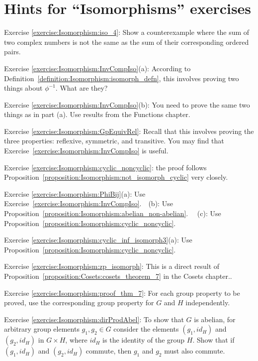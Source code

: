 \section{Hints for ``Isomorphisms'' exercises}
\label{sec:Isomorphism:Hints} 


\noindent Exercise \ref{exercise:Isomorphism:iso_4}:  Show a counterexample where the sum of two complex numbers is not the same as the sum of their corresponding ordered pairs.

\noindent Exercise \ref{exercise:Isomorphism:InvCompIso}(a):  According to Definition~\ref{definition:Isomorphism:isomorph_defn}, this involves proving two things about $\phi^{-1}$.  What are they?

\noindent Exercise \ref{exercise:Isomorphism:InvCompIso}(b): You need to prove the same two things as in part (a).  Use results from the Functions chapter.

\noindent Exercise \ref{exercise:Isomorphism:GpEquivRel}:   Recall that this involves proving the three properties: reflexive, symmetric, and transitive. You may find that Exercise~\ref{exercise:Isomorphism:InvCompIso}  is useful.

\noindent Exercise \ref{exercise:Isomorphism:cyclic_noncyclic}:   the proof follows Proposition~\ref{proposition:Isomorphism:not_isomorph_cyclic} very closely.

\noindent Exercise \ref{exercise:Isomorphism:PhiBij}(a): Use Exercise~\ref{exercise:Isomorphism:InvCompIso}.~~(b):  Use Proposition~\ref{proposition:Isomorphism:abelian_non-abelian}. ~~(c):  Use Proposition~\ref{proposition:Isomorphism:cyclic_noncyclic}. 

\noindent Exercise \ref{exercise:Isomorphism:cyclic_inf_isomorph3}(a): Use Proposition~\ref{proposition:Isomorphism:cyclic_noncyclic}.

\noindent Exercise \ref{exercise:Isomorphism:zp_isomorph}: This  is a direct result of Proposition~\ref{proposition:Cosets:cosets_theorem_7} in the Cosets chapter..

\noindent Exercise \ref{exercise:Isomorphism:proof_thm_7}: For each group property to be proved, use the corresponding group property for $G$ and $H$ independently.

\noindent Exercise \ref{exercise:Isomorphism:dirProdAbel}: To show that $G$ is abelian, for arbitrary group elements $g_1, g_2 \in G$ consider the elements $(g_1, id_H)$ and $(g_2,id_H)$ in $G \times H$, where $id_H$ is the identity of the group $H$.  Show that if $(g_1, id_H)$ and $(g_2,id_H)$ commute, then $g_1$ and $g_2$ must also commute. 



